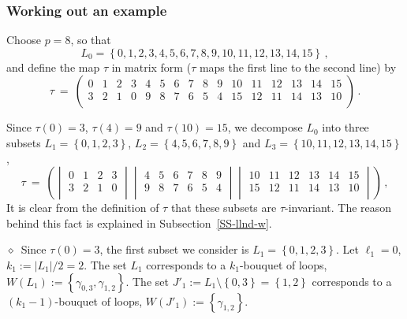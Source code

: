 \documentclass[12pt,a4paper]{amsart}
\theoremstyle{plain} %
\theoremstyle{definition}
\numberwithin{equation}{section}
\numberwithin{figure}{section}
\numberwithin{table}{section}
\newcommand{\sm}{\!\setminus\!}
\newcommand{\set}[1]{\left\lbrace #1 \right\rbrace}
\newcommand{\noid}{\noindent $\diamond$~}
\begin{document}
\subsubsection{Working out an example} Choose $p=8$, so that
%
\begin{equation*}
L_0 = \set{0,1,2,3,4,5,6,7,8,9,10,11,12,13,14,15}\,,
\end{equation*}
%
and define the map $\tau$ in matrix form ($\tau$ maps the first line to the second line) by
%
\setcounter{MaxMatrixCols}{20}
\begin{equation}%
\tau ~=~
\begin{pmatrix}
  0 & 1 & 2 & 3 & 4 & 5 & 6 & 7 & 8 & 9 & {10} & 11 & 12 & 13 & 14 & 15\\
  3 & 2 & 1 & 0 &9  & 8 & 7 & 6 & 5 & 4 & 15 & 12 & 11 & 14 & 13 & 10\\
\end{pmatrix}\,.
\end{equation}

Since $\tau(0) = 3$, $\tau(4) = 9$ and $\tau(10) = 15$, we decompose $L_0$ into three subsets $L_1 = \set{0,1,2,3}$, $L_2 = \set{4,5,6,7,8,9}$ and $L_3 = \set{10, 11, 12, 13, 14, 15}$,
%
\begin{equation}%
\tau ~=~\left(
\begin{vmatrix}
  0 & 1 & 2 & 3 \\
  3 & 2 & 1 & 0 \\
\end{vmatrix}
\begin{vmatrix}
  4 & 5 & 6 & 7 & 8 & 9 \\
  9 & 8 & 7 & 6 & 5 & 4 \\
\end{vmatrix}
\begin{vmatrix}
  10 & 11 & 12 & 13 & 14 & 15 \\
  15 & 12 & 11 & 14 & 13 & 10 \\
\end{vmatrix}
\right)\,,
\end{equation}
%
It is clear from the definition of $\tau$ that these subsets are $\tau$-invariant. The reason behind this fact is explained in Subsection~\ref{SS-llnd-w}.\smallskip

\noid Since $\tau(0)=3$, the first subset we consider is $L_1 = \set{0,1,2,3}$. Let $\ell_1 = 0$, $k_1 := |L_1|/2 = 2$. The set $L_1$ corresponds to a $k_1$-bouquet of loops, $W(L_1) := \set{\gamma_{0,3},\gamma_{1,2}}$. The set $J'_1 := L_1\sm\set{0,3} = \set{1,2}$ corresponds to a $(k_1-1)$-bouquet of loops, $W(J'_1) := \set{\gamma_{1,2}}$. \smallskip
\end{document}
